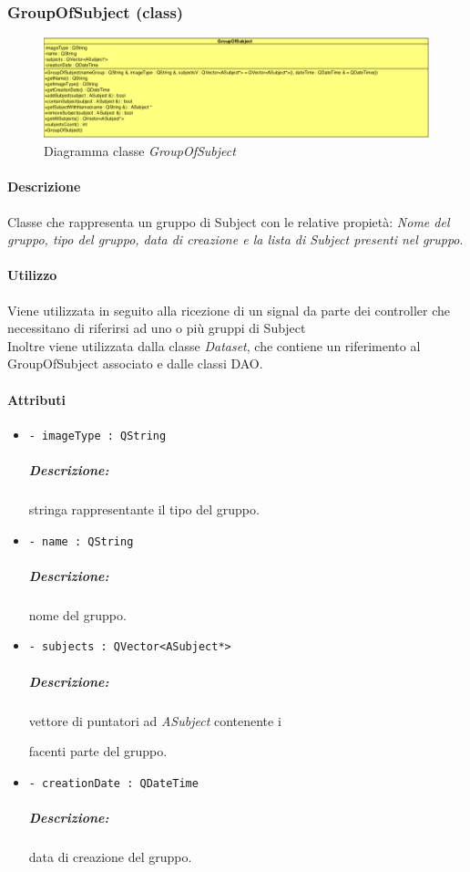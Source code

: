 \subsubsection{GroupOfSubject (class)}
\label{groupOfSubject}
\begin{figure}[!h]
\centering
			\includegraphics[width=1.2\linewidth]{./Content/Immagini/modelCore/GroupOfSubject.png}
			\caption{Diagramma classe \textsl{GroupOfSubject}}
			\label{groupOfSubject_img}
\end{figure}

\paragraph{Descrizione \\}
Classe che rappresenta un gruppo di Subject\g{} con le relative propietà: \emph{Nome del gruppo, tipo del gruppo, data di creazione e la lista di Subject\g{} presenti nel gruppo}.

\paragraph{Utilizzo \\}
Viene utilizzata in seguito alla ricezione di un signal\g{} da parte dei controller che necessitano di riferirsi ad uno o più gruppi di Subject\g{}
\\Inoltre viene utilizzata dalla classe \textsl{Dataset}, che contiene un riferimento al GroupOfSubject\g{} associato e dalle classi DAO.

\paragraph{Attributi }
	\begin{itemize}
		\item \color{teal}\verb!- imageType : QString!
		\color{black}\subparagraph{Descrizione:} stringa rappresentante il tipo del gruppo.
		
		
		\item \color{teal}\verb!- name : QString !
		\color{black}\subparagraph{Descrizione:} nome del gruppo.
			
		\item \color{teal}\verb!- subjects : QVector<ASubject*> !
			\color{black}\subparagraph{Descrizione:} vettore di puntatori ad \textsl{ASubject} contenente i \subject{} facenti parte del gruppo.

		\item \color{teal}\verb!- creationDate : QDateTime !
			\color{black}\subparagraph{Descrizione:} data di creazione del gruppo.
	\end{itemize}
	

